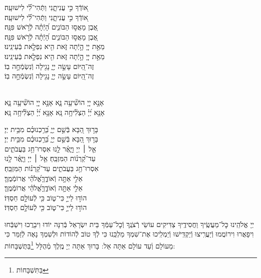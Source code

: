 \documentclass[twoside, openany, parskip=half, 11pt]{book}
\begin{document}
{\begin{narrow}
א֭וֹדְֿךָ כִּ֣י עֲנִיתָ֑נִי \hfill וַתְּֿהִי־לִ֗֝י לִישׁוּעָֽה׃ \\
\scriptsize{ א֭וֹדְֿךָ כִּ֣י עֲנִיתָ֑נִי \hfill וַתְּֿהִי־לִ֗֝י לִישׁוּעָֽה׃ \\}\normalsize{}
אֶ֭בֶן מָאֲס֣וּ הַבּוֹנִ֑ים \hfill הָ֝יְֿתָ֗ה לְֿרֹ֣אשׁ פִּנָּֽה׃ \\
\scriptsize{ אֶ֭בֶן מָאֲס֣וּ הַבּוֹנִ֑ים \hfill הָ֝יְֿתָ֗ה לְֿרֹ֣אשׁ פִּנָּֽה׃ \\}\normalsize{}
מֵאֵ֣ת יְיָ֭ הָ֣יְֿתָה זֹּ֑את \hfill הִ֖יא נִפְלָ֣את בְּֿעֵינֵֽינוּ׃ \\
\scriptsize{ מֵאֵ֣ת יְיָ֭ הָ֣יְֿתָה זֹּ֑את \hfill הִ֖יא נִפְלָ֣את בְּֿעֵינֵֽינוּ׃ \\}\normalsize{}
זֶה־הַ֭יּוֹם עָשָׂ֣ה יְיָ֑ \hfill נָגִ֖ילָה וְֿנִשְׂמְֿחָ֣ה בֽוֹ׃ \\
\scriptsize{ זֶה־הַ֭יּוֹם עָשָׂ֣ה יְיָ֑ \hfill נָגִ֖ילָה וְֿנִשְׂמְֿחָ֣ה בֽוֹ׃ } \normalsize{}


\\
אָנָּ֣א יְיָ֭ הוֹשִׁ֘יעָ֥ה נָּ֑א \hfill \scriptsize{אָנָּ֣א יְיָ֭ הוֹשִׁ֘יעָ֥ה נָּ֑א}\\ \normalsize
אָנָּ֥א יְ֝יָ֗ הַצְלִ֘יחָ֥ה נָּֽא \hfill \scriptsize{ אָנָּ֥א יְ֝יָ֗ הַצְלִ֘יחָ֥ה נָּֽא׃}\\ \normalsize


בָּר֣וּךְ הַ֭בָּא בְּֿשֵׁ֣ם יְיָ֑ \hfill בֵּ֝רַ֥כְנוּכֶ֗ם מִבֵּ֥ית יְיָ׃\\
\scriptsize{בָּר֣וּךְ הַ֭בָּא בְּֿשֵׁ֣ם יְיָ֑ \hfill בֵּ֝רַ֥כְנוּכֶ֗ם מִבֵּ֥ית יְיָ׃}\\
\normalsize{אֵ֤ל ׀ יְיָ וַיָּ֢אֶ֫ר לָ֥נוּ \hfill אִסְרוּ־חַ֥ג בַּעֲבֹתִ֑ים \\ עַד־קַ֝רְנ֗וֹת הַמִּזְבֵּֽחַ׃ \hfill }
\scriptsize{אֵ֤ל ׀ יְיָ וַיָּ֢אֶ֫ר לָ֥נוּ \\ אִסְרוּ־חַ֥ג בַּעֲבֹתִ֑ים \hfill עַד־קַ֝רְנ֗וֹת הַמִּזְבֵּֽחַ׃}\\
\normalsize{אֵלִ֣י אַתָּ֣ה וְֿאוֹדֶ֑ךָּ\hfill אֱ֝לֹהַ֗י אֲרוֹמְֿמֶֽךָּ׃}\\
\scriptsize{אֵלִ֣י אַתָּ֣ה וְֿאוֹדֶ֑ךָּ\hfill אֱ֝לֹהַ֗י אֲרוֹמְֿמֶֽךָּ׃}\\
\normalsize{הוֹד֣וּ לַייָ֣ כִּי־ט֑וֹב \hfill כִּ֖י לְֿעוֹלָ֣ם חַסְדּֽוֹ׃ }\\
\scriptsize{הוֹד֣וּ לַייָ֣ כִּי־ט֑וֹב \hfill כִּ֖י לְֿעוֹלָ֣ם חַסְדּֽוֹ׃ } \\
\normalsize{}

\end{narrow}

\negline

יְיָ אֱלֹהֵֽינוּ כׇּל־מַעֲשֶֽׂיךָ וַחֲסִידֶֽיךָ צַדִּיקִים עוֹשֵׂי רְֿצֹנֶֽךָ וְֿכׇל־עַמְּֿךָ בֵּית יִשְׂרָאֵל בְּֿרִנָּה יוֹדוּ וִיבָרֲכוּ וִישַׁבְּֿחוּ וִיפָאֲרוּ וִירוֹמֲמוּ וְֿיַעֲרִֽיצוּ וְֿיַקְדִּֽישׁוּ וְֿיַמְלִֽיכוּ אֶת־שִׁמְךָ מַלְכֵּֽנוּ כִּי לְֿךָ טוֹב לְֿהוֹדוֹת וּלְשִׁמְךָ נָאֶה לְֿזַמֵּר כִּי מֵעוֹלָם וְֿעַד עוֹלָם אַתָּה אֵל: בָּרוּךְ אַתָּה יְיָ מֶֽלֶךְ מְֿהֻלָּל \footnote{בַּתִּשְׁבָּחוֹת}בַּתֻּשְׁבָּחוֹת:
}
\end{document}
